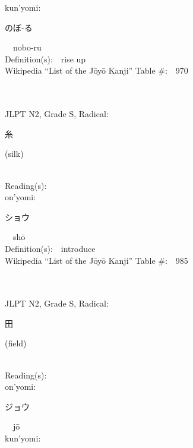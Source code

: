 \begin{multicols}{2}
{\hspace*{1em}}kun'yomi:\ \ \\
{\hspace*{2em}}{\begin{CJK}{UTF8}{min} のぼ-る \end{CJK}}\ \ nobo-ru\ \ \\
Definition(s):\ \ rise up \\
Wikipedia ``List of the J\=oy\=o Kanji'' Table \#:\ \ 970 \\
\ \ \\
{\fontsize{34pt}{40pt}  }\ \ \\  %
{JLPT N2, Grade S, Radical:\ \ {\begin{CJK}{UTF8}{min} 糸 \end{CJK}} (silk) } \\
Reading(s):\ \ \\
{\hspace*{1em}}on'yomi:\ \ \\
{\hspace*{2em}}{\begin{CJK}{UTF8}{min} ショウ \end{CJK}}\ \ sh\=o\ \ \\
Definition(s):\ \ introduce \\
Wikipedia ``List of the J\=oy\=o Kanji'' Table \#:\ \ 985 \\
\ \ \\
{\fontsize{34pt}{40pt}  }\ \ \\  %
{JLPT N2, Grade S, Radical:\ \ {\begin{CJK}{UTF8}{min} 田 \end{CJK}} (field) } \\
Reading(s):\ \ \\
{\hspace*{1em}}on'yomi:\ \ \\
{\hspace*{2em}}{\begin{CJK}{UTF8}{min} ジョウ \end{CJK}}\ \ j\=o\ \ \\
{\hspace*{1em}}kun'yomi:\ \ \\

\end{multicols}

